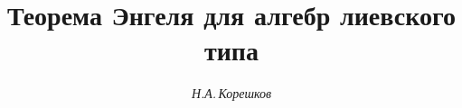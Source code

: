 

 




 


\newcommand{\la}{\langle} 


\newcommand{\ra}{\rangle} 


\newcommand{\Ker}{\operatorname{Ker}} 


\newcommand{\End}{\operatorname{End}} 


\newcommand{\Ann}{\operatorname{Ann}} 


\newcommand{\Mod}{\operatorname{mod}} 


\newcommand{\mymat}[1]{\mathop{#1}\limits} 


 


 




\setcounter{page}{30} 












 


\author{\it Н.А.\,Корешков} 




\title{Теорема Энгеля для алгебр лиевского типа} 


 


\date{} 




\pagestyle{plain} %


 



